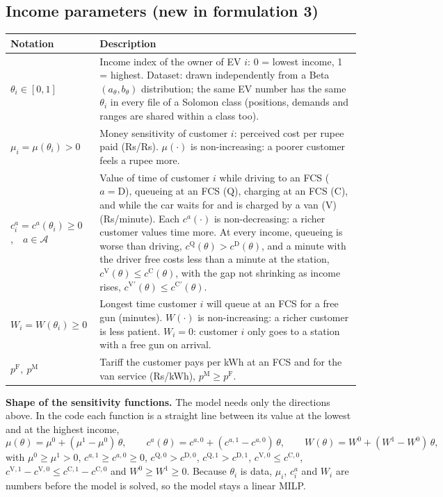 \documentclass[12pt,a4paper]{article}
\begin{document}
\subsection*{Income parameters (new in formulation 3)}
{\small
\begin{tabularx}{\textwidth}{@{}>{\raggedright\arraybackslash}p{4.6cm}X@{}}
\toprule
\textbf{Notation} & \textbf{Description} \\
\midrule
$\theta_i\in[0,1]$ & Income index of the owner of EV $i$: 0 = lowest income, 1 = highest. Dataset: drawn independently from a Beta$(a_\theta,b_\theta)$ distribution; the same EV number has the same $\theta_i$ in every file of a Solomon class (positions, demands and ranges are shared within a class too). \\[2pt]
$\mu_i=\mu(\theta_i)>0$ & Money sensitivity of customer $i$: perceived cost per rupee paid (Rs/Rs). $\mu(\cdot)$ is non-increasing: a poorer customer feels a rupee more. \\[2pt]
$c^{a}_i=c^{a}(\theta_i)\ge0$,\ \ $a\in\mathcal A$ & Value of time of customer $i$ while driving to an FCS ($a=\mathrm D$), queueing at an FCS ($\mathrm Q$), charging at an FCS ($\mathrm C$), and while the car waits for and is charged by a van ($\mathrm V$) (Rs/minute). Each $c^{a}(\cdot)$ is non-decreasing: a richer customer values time more. At every income, queueing is worse than driving, $c^{\mathrm Q}(\theta)>c^{\mathrm D}(\theta)$, and a minute with the driver free costs less than a minute at the station, $c^{\mathrm V}(\theta)\le c^{\mathrm C}(\theta)$, with the gap not shrinking as income rises, $c^{\mathrm V\prime}(\theta)\le c^{\mathrm C\prime}(\theta)$. \\[2pt]
$W_i=W(\theta_i)\ge0$ & Longest time customer $i$ will queue at an FCS for a free gun (minutes). $W(\cdot)$ is non-increasing: a richer customer is less patient. $W_i=0$: customer $i$ only goes to a station with a free gun on arrival. \\[2pt]
$p^{\mathrm F},\ p^{\mathrm M}$ & Tariff the customer pays per kWh at an FCS and for the van service (Rs/kWh), $p^{\mathrm M}\ge p^{\mathrm F}$. \\
\bottomrule
\end{tabularx}}

\textbf{Shape of the sensitivity functions.} The model needs only the directions above. In the code each function is a straight line between its value at the lowest and at the highest income,
\[
\mu(\theta)=\mu^{0}+(\mu^{1}-\mu^{0})\,\theta,\qquad
c^{a}(\theta)=c^{a,0}+(c^{a,1}-c^{a,0})\,\theta,\qquad
W(\theta)=W^{0}+(W^{1}-W^{0})\,\theta,
\]
with $\mu^{0}\ge\mu^{1}>0$, $c^{a,1}\ge c^{a,0}\ge0$, $c^{\mathrm Q,0}>c^{\mathrm D,0}$, $c^{\mathrm Q,1}>c^{\mathrm D,1}$, $c^{\mathrm V,0}\le c^{\mathrm C,0}$, $c^{\mathrm V,1}-c^{\mathrm V,0}\le c^{\mathrm C,1}-c^{\mathrm C,0}$ and $W^{0}\ge W^{1}\ge0$. Because $\theta_i$ is data, $\mu_i$, $c^{a}_i$ and $W_i$ are numbers before the model is solved, so the model stays a linear MILP.
\end{document}
